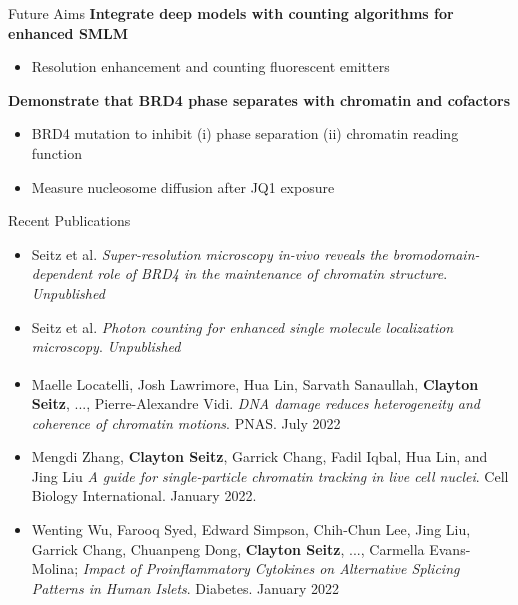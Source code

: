 \documentclass{beamer}					%
\begin{document}
\begin{frame}{Future Aims}
\textbf{Integrate deep models with counting algorithms for enhanced SMLM}
\begin{itemize}
\item Resolution enhancement and counting fluorescent emitters
\end{itemize}
\textbf{Demonstrate that BRD4 phase separates with chromatin and cofactors}
\begin{itemize}
\item BRD4 mutation to inhibit (i) phase separation (ii) chromatin reading function
\item Measure nucleosome diffusion after JQ1 exposure
\end{itemize}
\end{frame}


\begin{frame}{Recent Publications}

\begin{itemize}
\item Seitz et al. \textit{Super-resolution microscopy in-vivo reveals the bromodomain-dependent role of BRD4 in the maintenance of chromatin structure}. \textit{Unpublished}

\item Seitz et al. \textit{Photon counting for enhanced single molecule localization microscopy}. \textit{Unpublished}

\item Maelle Locatelli\textsuperscript{\textdagger}, Josh Lawrimore\textsuperscript{\textdagger}, Hua Lin\textsuperscript{\textdagger}, Sarvath Sanaullah, \textbf{Clayton Seitz}, ..., Pierre-Alexandre Vidi. \textit{DNA damage reduces heterogeneity and coherence of chromatin motions}. PNAS. July 2022\\
\vspace{0.1in}
\item Mengdi Zhang, \textbf{Clayton Seitz}, Garrick Chang, Fadil Iqbal, Hua Lin, and Jing Liu \textit{A guide for single-particle chromatin tracking in live cell nuclei}. Cell Biology International. January 2022.\\
\vspace{0.1in}
\item Wenting Wu, Farooq Syed, Edward Simpson, Chih-Chun Lee, Jing Liu, Garrick Chang, Chuanpeng Dong, \textbf{Clayton Seitz}, ..., Carmella Evans-Molina; \textit{Impact of Proinflammatory Cytokines on Alternative Splicing Patterns in Human Islets}. Diabetes. January 2022
\end{itemize}
\end{frame}
\end{document}
